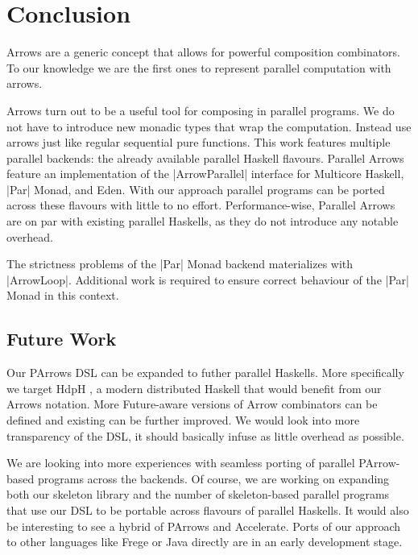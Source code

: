 
\section{Conclusion}
\label{sec:conclusion}
Arrows are a generic concept that allows for powerful composition combinators. To our knowledge we are the first ones to represent parallel computation with arrows. \done

Arrows turn out to be a useful tool for composing in parallel programs. We do not have to introduce new monadic types that wrap the computation. Instead use arrows just like regular sequential pure functions. 
%
This work features multiple parallel backends: the already available parallel Haskell flavours. Parallel Arrows feature an implementation of the |ArrowParallel| interface for Multicore Haskell, |Par| Monad, and Eden. With our approach parallel programs can be ported across these flavours with little to no effort.
%
%
Performance-wise, Parallel Arrows are on par with existing parallel Haskells, as they do not introduce any notable overhead.

The strictness problems of the |Par| Monad backend materializes with |ArrowLoop|. Additional work is required to ensure correct behaviour of the |Par| Monad in this context.



\subsection{Future Work}
\label{sec:future-work}

Our PArrows DSL can be expanded to futher parallel Haskells. More specifically we target HdpH \cite{Maier:2014:HDS:2775050.2633363}, a modern distributed Haskell that would benefit from our Arrows notation. More Future-aware versions of Arrow combinators can be defined and existing can be further improved. We would look into more transparency of the DSL, it should basically infuse as little overhead as possible.

We are looking into more experiences with seamless porting of parallel PArrow-based programs across the backends.
Of course, we are working on expanding both our skeleton library and the number of skeleton-based parallel programs that use our DSL to be portable across flavours of parallel Haskells.
It would also be interesting to see a hybrid of PArrows and Accelerate.
Ports of our approach to other languages like Frege or Java directly are in an early development stage.
